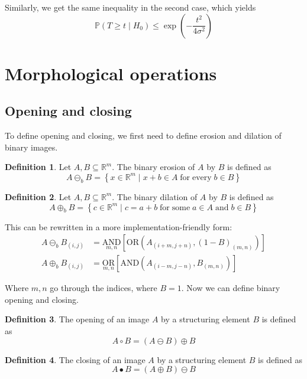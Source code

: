 \documentclass[a4paper,12pt]{article}
\theoremstyle{plain}
\theoremstyle{definition}
\newtheorem{definition}{Definition}
\theoremstyle{remark}
\begin{document}
Similarly, we get the same inequality in the second case, which yields
\begin{equation}
	\mathbb{P}(T \geq t \mid H_0) \leq \exp \left( - \frac{t^2}{4 \sigma^2} \right)
\end{equation}

\newpage

\section{Morphological operations}

\subsection{Opening and closing}

To define opening and closing, we first need to define erosion and dilation of binary images.

\begin{definition}
	Let $A, B \subseteq \mathbb{R}^m$. The binary erosion of $A$ by $B$ is defined as
	\begin{equation*}
		A \ominus_b B = \left\{ x \in \mathbb{R}^m \mid x + b \in A \; \mathrm{for \; every} \; b \in B \right\}
	\end{equation*}
\end{definition}
\begin{definition}
	Let $A, B \subseteq \mathbb{R}^m$. The binary dilation of $A$ by $B$ is defined as
	\begin{equation*}
		A \oplus_b B = \left\{ c \in \mathbb{R}^m \mid c = a + b \; \mathrm{for \; some} \; a \in A \; \mathrm{and} \; b \in B \right\}
	\end{equation*}
\end{definition}

This can be rewritten in a more implementation-friendly form:
\begin{align*}
	A \ominus_b B_{(i, j)} &= \underset{m, n}{\mathrm{AND}} [ \mathrm{OR} (A_{(i + m, j + n)}, (1 - B)_{(m, n)}) ] \\
	A \oplus_b B_{(i, j)} &= \underset{m, n}{\mathrm{OR}} [ \mathrm{AND} (A_{(i - m, j - n)}, B_{(m, n)}) ]
\end{align*}

Where $m, n$ go through the indices, where $B = 1$. Now we can define binary opening and closing.

\begin{definition}
	The opening of an image $A$ by a structuring element $B$ is defined as
	\begin{equation*}
		A \circ B = (A \ominus B) \oplus B
	\end{equation*}
\end{definition}
\begin{definition}
	The closing of an image $A$ by a structuring element $B$ is defined as
	\begin{equation*}
		A \bullet B = (A \oplus B) \ominus B
	\end{equation*}
\end{definition}
\end{document}
